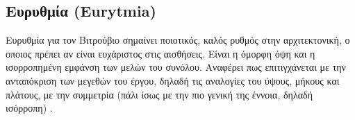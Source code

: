   
  




\subsection{Ευρυθμία (Eurytmia)}
  
Ευρυθμία για τον Βιτρούβιο σημαίνει ποιοτικός, καλός ρυθμός στην αρχιτεκτονική, ο οποιος πρέπει αν είναι ευχάριστος στις αισθήσεις. Είναι η όμορφη όψη και η ισορροπημένη εμφάνση των μελών του συνόλου. \cite[σ.~51,95]{vitruvius-lefas} Αναφέρει πως επιτιγχάνεται με την ανταπόκριση των μεγεθών του έργου, δηλαδή τις αναλογίες του ύψους, μήκους και πλάτους, με την συμμετρία (πάλι ίσως με την πιο γενική της έννοια, δηλαδή ισόρροπη) \cite[σ.~95,498]{vitruvius-lefas,scranton_vitruvius_1974}. 

  
  



